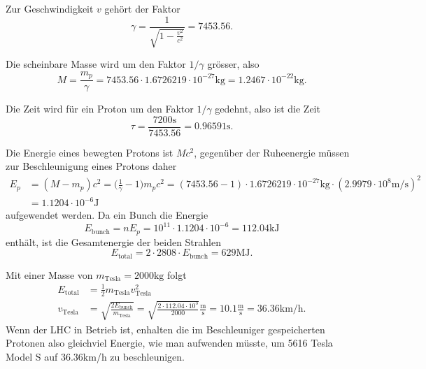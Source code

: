 \begin{loesung}
Zur Geschwindigkeit  $v$ gehört der Faktor
\[
\gamma
=
\frac1{\displaystyle\sqrt{1-\frac{v^2}{c^2}}}
=
7453.56.
\]
\begin{teilaufgaben}
\item Die scheinbare Masse wird um den Faktor $1/\gamma$ grösser, also
\[
M
=
\frac{m_p}{\gamma}
=
7453.56
\cdot
1.6726219\cdot 10^{-27}\text{kg}
=
1.2467\cdot 10^{-22}\text{kg}.
\]
\item Die Zeit wird für ein Proton um den Faktor $1/\gamma$ gedehnt,
also ist die Zeit 
\[
\tau = \frac{7200\text{s}}{7453.56}=0.96591\text{s}.
\]
\item 
Die Energie eines bewegten Protons ist $Mc^2$, gegenüber der
Ruheenergie müssen zur Beschleunigung eines Protons daher
\begin{align*}
E_p
&=
(M-m_p)c^2 
=
\biggl(\frac{1}{\gamma}-1\biggr)m_pc^2
=
(7453.56-1)\cdot
1.6726219\cdot 10^{-27}\text{kg}
\cdot
(2.9979\cdot 10^{8}\text{m/s})^2
\\
&=
1.1204\cdot 10^{-6}\text{J}
\end{align*}
aufgewendet werden.
Da ein Bunch die Energie
\[
E_{\text{bunch}}
=
nE_p
=
10^{11}\cdot1.1204\cdot 10^{-6}
=
112.04\text{kJ}
\]
enthält, ist die Gesamtenergie der beiden Strahlen
\[
E_{\text{total}}
=
2\cdot 2808\cdot E_{\text{bunch}}
=
629\text{MJ}.
\]
\item
Mit einer Masse von $m_{\text{Tesla}}=2000\text{kg}$ folgt
\begin{align*}
E_{\text{total}}
&=
\frac12m_{\text{Tesla}}v_{\text{Tesla}}^2
\\
v_{\text{Tesla}}
&=\sqrt{
\frac{2E_{\text{bunch}}}{m_{\text{Tesla}}}
}
=
\sqrt{\frac{2\cdot 112.04\cdot 10^3}{2000}}\frac{\text{m}}{\text{s}}
=
10.1\frac{\text{m}}{\text{s}}=36.36\text{km/h}.
\end{align*}
Wenn der LHC in Betrieb ist, enhalten die im Beschleuniger
gespeicherten Protonen also gleichviel Energie, wie man aufwenden müsste,
um 5616 Tesla Model S auf 36.36km/h zu beschleunigen.
\qedhere
\end{teilaufgaben}
\end{loesung}





